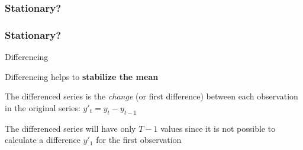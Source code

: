 \documentclass{beamer}
\newenvironment{wideitemize}{\itemize\addtolength{\itemsep}{10pt}}{\enditemize}
\begin{document}
\begin{frame}
  \frametitle{Stationary?}
\end{frame}

\begin{frame}
  \frametitle{Stationary?}
\end{frame}


\begin{frame}{Differencing}
  \begin{wideitemize}
  \item Differencing helps to \textbf{stabilize the mean}
  \item The differenced series is the \emph{change} (or first difference) between each observation in the original series: $y'_t = y_t - y_{t-1}$
  \item The differenced series will have only $T-1$ values since it is not possible to calculate a difference $y'_1$ for the first observation
  \end{wideitemize}

\end{frame}
\end{document}
